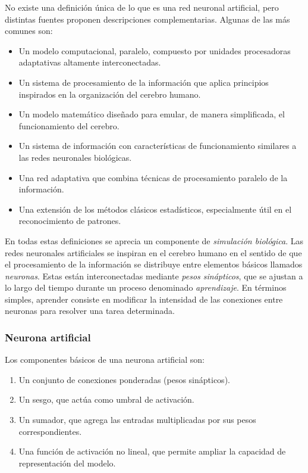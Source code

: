 \documentclass[letterpaper,12pt, twoside]{report}
\begin{document}
No existe una definición única de lo que es una red neuronal artificial, pero distintas fuentes proponen descripciones complementarias. Algunas de las más comunes son:

\begin{itemize}
    \item Un modelo computacional, paralelo, compuesto por unidades procesadoras adaptativas altamente interconectadas.
    \item Un sistema de procesamiento de la información que aplica principios inspirados en la organización del cerebro humano.
    \item Un modelo matemático diseñado para emular, de manera simplificada, el funcionamiento del cerebro.
    \item Un sistema de información con características de funcionamiento similares a las redes neuronales biológicas.
    \item Una red adaptativa que combina técnicas de procesamiento paralelo de la información.
    \item Una extensión de los métodos clásicos estadísticos, especialmente útil en el reconocimiento de patrones.
\end{itemize}

En todas estas definiciones se aprecia un componente de \textit{simulación biológica}. Las redes neuronales artificiales se inspiran en el cerebro humano en el sentido de que el procesamiento de la información se distribuye entre elementos básicos llamados \textit{neuronas}. Estas están interconectadas mediante \textit{pesos sinápticos}, que se ajustan a lo largo del tiempo durante un proceso denominado \textit{aprendizaje}. En términos simples, aprender consiste en modificar la intensidad de las conexiones entre neuronas para resolver una tarea determinada.

\subsubsection*{Neurona artificial}

Los componentes básicos de una neurona artificial son:

\begin{enumerate}
    \item Un conjunto de conexiones ponderadas (pesos sinápticos).
    \item Un sesgo, que actúa como umbral de activación.
    \item Un sumador, que agrega las entradas multiplicadas por sus pesos correspondientes.
    \item Una función de activación no lineal, que permite ampliar la capacidad de representación del modelo.
\end{enumerate}
\end{document}
